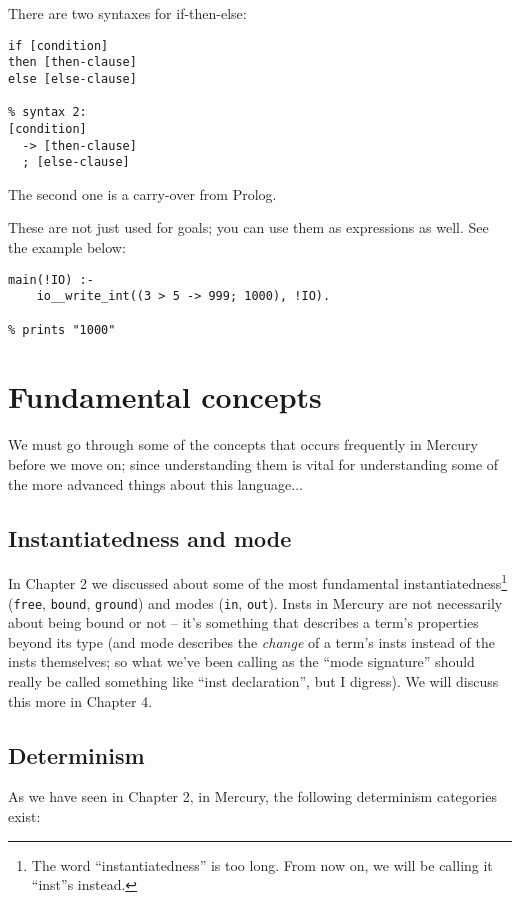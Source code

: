 There are two syntaxes for if-then-else:

\begin{lstlisting}[language=Mercury]
% syntax 1:
if [condition]
then [then-clause]
else [else-clause]

% syntax 2:
[condition]
  -> [then-clause]
  ; [else-clause]
\end{lstlisting}

The second one is a carry-over from Prolog.

These are not just used for goals; you can use them as expressions as well. See the example below:

\begin{lstlisting}[language=Mercury]
main(!IO) :-
	io__write_int((3 > 5 -> 999; 1000), !IO).

% prints "1000"
\end{lstlisting}

\section{Fundamental concepts}

We must go through some of the concepts that occurs frequently in Mercury before we move on; since understanding them is vital for understanding some of the more advanced things about this language...

\subsection{Instantiatedness and mode}

In Chapter 2 we discussed about some of the most fundamental instantiatedness\footnote{The word ``instantiatedness'' is too long. From now on, we will be calling it ``inst''s instead.} (\texttt{free}, \texttt{bound}, \texttt{ground}) and modes (\texttt{in}, \texttt{out}). Insts in Mercury are not necessarily about being bound or not -- it's something that describes a term's properties beyond its type (and mode describes the \textit{change} of a term's insts instead of the insts themselves; so what we've been calling as the ``mode signature'' should really be called something like ``inst declaration'', but I digress). We will discuss this more in Chapter 4.

\subsection{Determinism}

As we have seen in Chapter 2, in Mercury, the following determinism categories exist:

